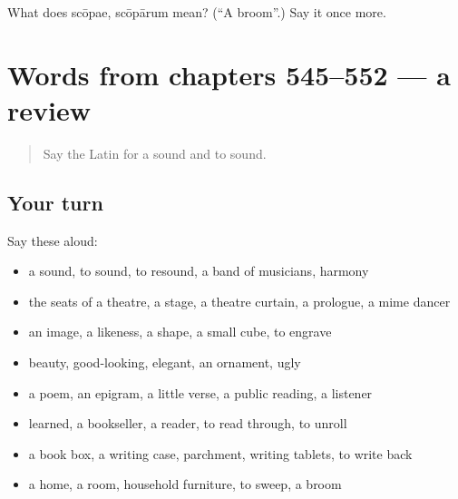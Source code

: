 \begin{tcolorbox}[breakable,colback=teal!4,colframe=teal!35!black,title={Before you move on}]
What does scōpae, scōpārum mean? (\textquotedblleft{}A broom\textquotedblright{}.) Say it once more.
\end{tcolorbox}
\section[(dialogue)]{Words from chapters 545–552 — a review}

\label{lesson:LA-R552-review-545-552}



\begin{quote}
Say the Latin for a sound and to sound.
\end{quote}

\subsection*{Your turn}
Say these aloud:

\begin{itemize}
\raggedright
  \item a sound, to sound, to resound, a band of musicians, harmony
  \item the seats of a theatre, a stage, a theatre curtain, a prologue, a mime dancer
  \item an image, a likeness, a shape, a small cube, to engrave
  \item beauty, good-looking, elegant, an ornament, ugly
  \item a poem, an epigram, a little verse, a public reading, a listener
  \item learned, a bookseller, a reader, to read through, to unroll
  \item a book box, a writing case, parchment, writing tablets, to write back
  \item a home, a room, household furniture, to sweep, a broom
\end{itemize}

